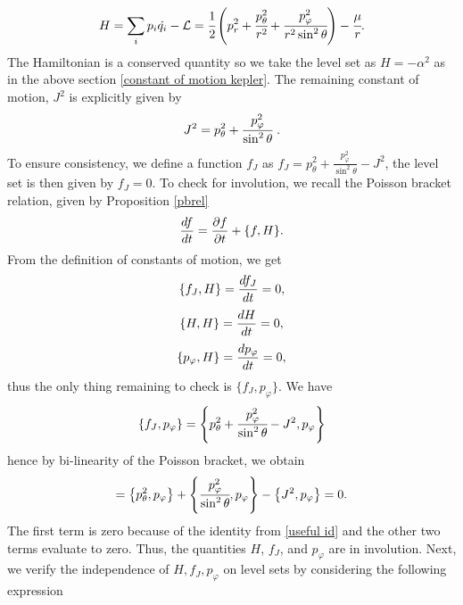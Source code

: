 \documentclass[12pt,oneside]{report}
\theoremstyle{definition}
\begin{document}
$$ H = \sum_{i}p_{i}\dot{q_{i}} - \mathcal{L}=\cfrac{1}{2} \left( p_{r}^{2}+\cfrac{p_{\theta}^{2}}{r^{2}}+\cfrac{p_{\varphi}^{2}}{r^{2}\sin^{2}{\theta}} \right) -\cfrac{\mu}{r}.$$
The Hamiltonian is a conserved quantity so we take the level set as $H=-\alpha^{2}$ as in the above section \ref{constant of motion kepler}. The remaining constant of motion, $J^{2}$ is explicitly given by
\begin{equation}\label{2.28}
    J^{2} = p_{\theta}^{2} + \cfrac{p_{\varphi}^{2}}{\sin^{2}{\theta}} \ .
\end{equation} 
To ensure consistency, we define a function $f_{J}$ as $f_{J} = p_{\theta}^{2}+\frac{p_{\varphi}^{2}}{\sin^{2}{\theta}}-J^{2}$, the level set is then given by $f_{J} = 0$.
To check for involution, we recall the Poisson bracket relation, given by Proposition \ref{pbrel}
$$ \displaystyle\frac{d f}{d t} = \displaystyle\frac{\partial f}{\partial t} + \{f,H\}.$$
From the definition of constants of motion, we get
$$ \{f_{J},H\} = \displaystyle\frac{d f_{J}}{d t} = 0,$$
$$ \{H,H\} = \displaystyle\frac{d H}{d t} = 0,$$
$$ \{p_{\varphi},H\} = \displaystyle\frac{d p_{\varphi}}{d t} = 0,$$
thus the only thing remaining to check is $\{f_{J},p_{\varphi}\}$. We have
$$ \{f_{J},p_{\varphi}\} = \left\{ p_{\theta}^{2} + \cfrac{p_{\varphi}^{2} }{\sin^{2}{\theta}}-J^{2} , p_{\varphi} \right\} $$
hence by bi-linearity of the Poisson bracket, we obtain
$$  = \left\{ p_{\theta}^{2} , p_{\varphi} \right\}  + \left\{  \cfrac{p_{\varphi}^{2}}{\sin^{2}{\theta}} , p_{\varphi} \right\}-\displaystyle \left\{ J^{2} , p_{\varphi} \right\} = 0.$$
The first term is zero because of the identity from \autoref{useful id} and the other two terms  evaluate to zero. Thus, the quantities $H$, $f_{J}$, and $p_{\varphi}$ are in involution. Next, we verify the independence of $H, f_{J}, p_{\varphi}$ on level sets by considering the following expression
\end{document}
